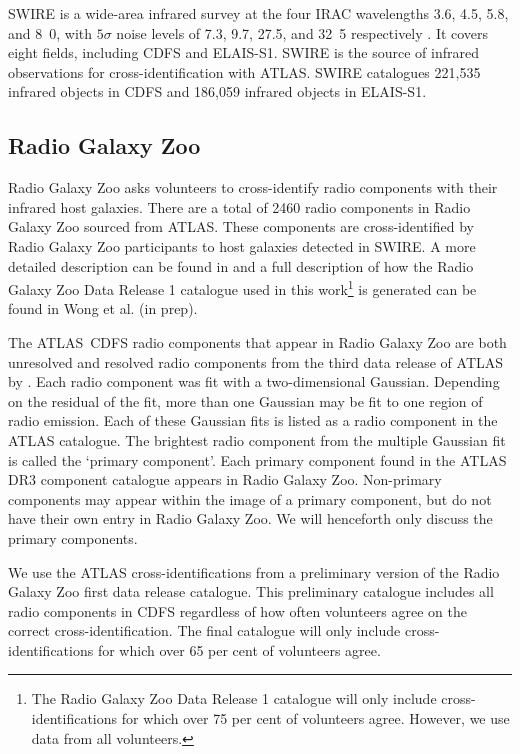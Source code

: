 \documentclass[fleqn,usenatbib,usedcolumn]{mnras}
\newcommand{\jansky}{\text{Jy}}
\begin{document}
    SWIRE \citep{lonsdale03swire, surace05swire} is a wide-area infrared
    survey at the four IRAC wavelengths 3.6, 4.5, 5.8, and
    \unit{8.0}{\micro\meter}, with $5\sigma$ noise levels of 7.3,
    9.7, 27.5, and \unit{32.5}{\micro\jansky} respectively
    \citep{lonsdale03swire}. It covers eight fields, including CDFS and ELAIS-S1. SWIRE is the source of infrared
    observations for cross-identification with ATLAS. SWIRE catalogues 221,535
    infrared objects in CDFS and 186,059 infrared objects in ELAIS-S1.

  \subsection{Radio Galaxy Zoo}\label{sec:rgz}

    Radio Galaxy Zoo asks volunteers to cross-identify radio components with
    their infrared host galaxies. There are a total of 2460 radio
    components in Radio Galaxy Zoo sourced from ATLAS. These
    components are cross-identified by Radio Galaxy Zoo participants to host galaxies detected in SWIRE.
    A more detailed description can be found in
    \citet{banfield15} and a full description of how the Radio Galaxy Zoo Data Release 1 catalogue used in this work\footnote{The Radio Galaxy Zoo Data Release 1 catalogue will only
    include cross-identifications for which over 75 per cent of volunteers
    agree. However, we use data from all volunteers.}
    is generated can be found in Wong et al. (in prep).

     The ATLAS~CDFS radio components that appear in Radio Galaxy Zoo are both unresolved and resolved radio components from the third data release of ATLAS by \citet{franzen15}.  Each radio component was fit with a two-dimensional
    Gaussian. Depending on the residual of the fit, more than one Gaussian may
    be fit to one region of radio emission.  Each of these Gaussian fits is
    listed as a radio component in the ATLAS catalogue. The brightest radio
    component from the multiple Gaussian fit is called the `primary
    component'. Each primary component found in the ATLAS DR3 component
    catalogue appears in Radio Galaxy Zoo. Non-primary components may appear
    within the image of a primary component, but do not have their own entry
    in Radio Galaxy Zoo. We will henceforth only discuss the primary
    components.

    We use the ATLAS cross-identifications from a preliminary version of the
    Radio Galaxy Zoo first data release catalogue. This preliminary catalogue
    includes all radio components in CDFS regardless of how often volunteers
    agree on the correct cross-identification. The final catalogue will only
    include cross-identifications for which over 65 per cent of volunteers
    agree.
\end{document}
